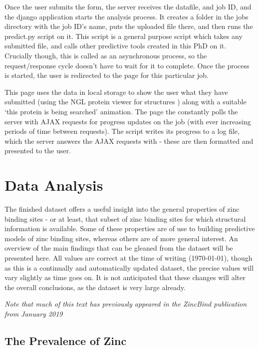 Once the user submits the form, the server receives the datafile, and job ID, and the django application starts the analysis process. It creates a folder in the jobs directory with the job ID's name, puts the uploaded file there, and then runs the predict.py script on it. This script is a general purpose script which takes any submitted file, and calls other predictive tools created in this PhD on it. Crucially though, this is called as an asynchronous process, so the request/response cycle doesn't have to wait for it to complete. Once the process is started, the user is redirected to the page for this particular job.

This page uses the data in local storage to show the user what they have submitted (using the NGL protein viewer for structures ) along with a suitable `this protein is being searched' animation. The page the constantly polls the server with AJAX requests for progress updates on the job (with ever increasing periods of time between requests). The script writes its progress to a log file, which the server answers the AJAX requests with - these are then formatted and presented to the user.



\section{Data Analysis}

The finished dataset offers a useful insight into the general properties of zinc binding sites - or at least, that subset of zinc binding sites for which structural information is available. Some of these properties are of use to building predictive models of zinc binding sites, whereas others are of more general interest. An overview of the main findings that can be gleaned from the dataset will be presented here. All values are correct at the time of writing ({\today}), though as this is a continually and automatically updated dataset, the precise values will vary slightly as time goes on. It is not anticipated that these changes will alter the overall conclusions, as the dataset is very large already.

\emph{Note that much of this text has previously appeared in the ZincBind publication from January 2019}

\subsection{The Prevalence of Zinc}

